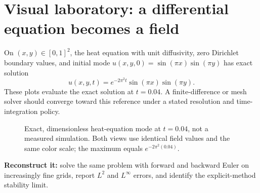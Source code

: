 \clearpage
\section*{Visual laboratory: a differential equation becomes a field}
\noindent On \((x,y)\in[0,1]^2\), the heat equation with unit diffusivity,
zero Dirichlet boundary values, and initial mode
\(u(x,y,0)=\sin(\pi x)\sin(\pi y)\) has exact solution
\[
u(x,y,t)=e^{-2\pi^2t}\sin(\pi x)\sin(\pi y).
\]
These plots evaluate the exact solution at \(t=0.04\).
A finite-difference or mesh solver should converge toward this
reference under a stated resolution and time-integration policy.
\begin{figure}[!htbp]
\centering
{}
\caption{Exact, dimensionless heat-equation mode at \(t=0.04\), not a
measured simulation. Both views use identical field values and the same
color scale; the maximum equals \(e^{-2\pi^2(0.04)}\).}
\label{fig:book02-heat-diffusion}
\end{figure}
\noindent\textbf{Reconstruct it:} solve the same problem with forward and
backward Euler on increasingly fine grids, report \(L^2\) and
\(L^\infty\) errors, and identify the explicit-method stability limit.
